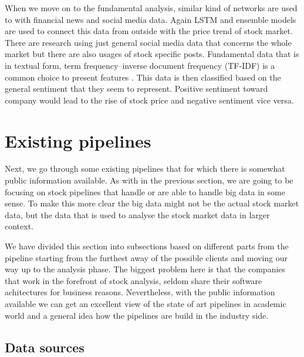 When we move on to the fundamental analysis, similar kind of networks are used to with financial news and social media data.
Again LSTM and ensemble models are used to connect this data from outside with the price trend of stock market.
There are research using just general social media data that concerns the whole market but there are also usages of stock specific posts.
Fundamental data that is in textual form, term frequency–inverse document frequency (TF-IDF) is a common choice to present features \cite{chungho}.
This data is then classified based on the general sentiment that they seem to represent.
Positive sentiment toward company would lead to the rise of stock price and negative sentiment vice versa.

\section{Existing pipelines}

Next, we go through some existing pipelines that for which there is somewhat public information available.
As with in the previous section, we are going to be focusing on stock pipelines that handle or are able to handle big data in some sense.
To make this more clear the big data might not be the actual stock market data, but the data that is used to analyse the stock market data in larger context.

We have divided this section into subsections based on different parts from the pipeline starting from the furthest away of the possible clients and moving our way up to the analysis phase.
The biggest problem here is that the companies that work in the forefront of stock analysis, seldom share their software achitectures for business reasons.
Nevertheless, with the public information available we can get an excellent view of the state of art pipelines in academic world and a general idea how the pipelines are build in the industry side.

\subsection{Data sources}

